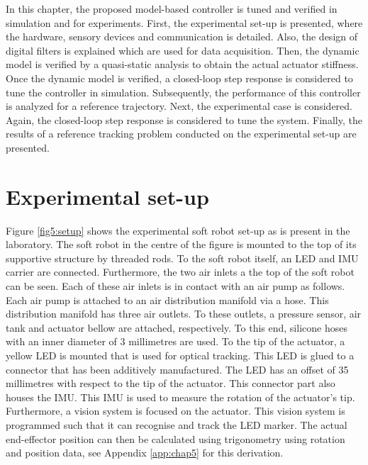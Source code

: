\label{chap5}




In this chapter, the proposed model-based controller is tuned and verified in simulation and for experiments. First, the experimental set-up is presented, where the hardware, sensory devices and communication is detailed. Also, the design of digital filters is explained which are used for data acquisition. Then, the dynamic model is verified by a quasi-static analysis to obtain the actual actuator stiffness. Once the dynamic model is verified, a closed-loop step response is considered to tune the controller in simulation. Subsequently, the performance of this controller is analyzed for a reference trajectory. Next, the experimental case is considered. Again, the closed-loop step response is considered to tune the system. Finally, the results of a reference tracking problem conducted on the experimental set-up are presented. 


\section{Experimental set-up}

Figure \ref{fig5:setup} shows the experimental soft robot set-up as is present in the laboratory. The soft robot in the centre of the figure is mounted to the top of its supportive structure by threaded rods. To the soft robot itself, an LED and IMU carrier are connected. Furthermore, the two air inlets a the top of the soft robot can be seen. Each of these air inlets is in contact with an air pump as follows. Each air pump is attached to an air distribution manifold via a hose. This distribution manifold has three air outlets. To these outlets, a pressure sensor, air tank and actuator bellow are attached, respectively. To this end, silicone hoses with an inner diameter of 3 millimetres are used. To the tip of the actuator, a yellow LED is mounted that is used for optical tracking. This LED is glued to a connector that has been additively manufactured. The LED has an offset of 35 millimetres with respect to the tip of the actuator. This connector part also houses the IMU. This IMU is used to measure the rotation of the actuator's tip. Furthermore, a vision system is focused on the actuator. This vision system is programmed such that it can recognise and track the LED marker. The actual end-effector position can then be calculated using trigonometry using rotation and position data, see Appendix \ref{app:chap5} for this derivation.


